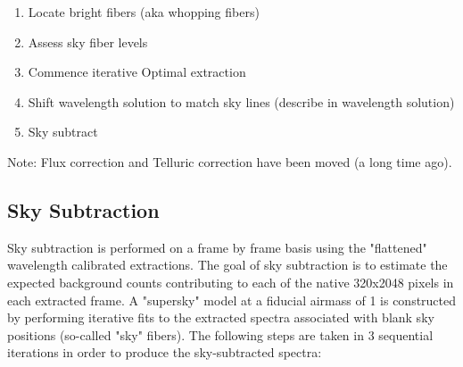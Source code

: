\begin{enumerate}
\item{Locate bright fibers (aka whopping fibers)}
\item{Assess sky fiber levels}
\item{Commence iterative Optimal extraction }
\item{Shift wavelength solution to match sky lines (describe in wavelength solution)}
\item{Sky subtract}

\end{enumerate}

Note: Flux correction and Telluric correction have been moved (a long time ago).


\subsection{Sky Subtraction}

Sky subtraction is performed on a frame by frame basis using the 
"flattened" wavelength calibrated extractions.  The goal of sky subtraction
is to estimate the expected background counts contributing to each of 
the native 320x2048 pixels in each extracted frame.  A "supersky" model 
at a fiducial airmass of 1 is constructed by performing iterative fits to
the extracted spectra associated with blank sky positions (so-called
"sky" fibers).   The following steps are taken in 3 sequential iterations
in order to produce the sky-subtracted spectra:

